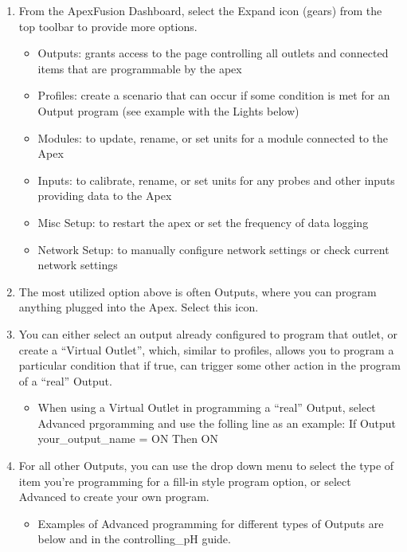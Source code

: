 \documentclass[]{book}
\providecommand{\tightlist}{%
  \setlength{\itemsep}{0pt}\setlength{\parskip}{0pt}}
\begin{document}
\begin{enumerate}
\def\labelenumi{\arabic{enumi}.}
\tightlist
\item
  From the ApexFusion Dashboard, select the Expand icon (gears) from the
  top toolbar to provide more options.

  \begin{itemize}
  \tightlist
  \item
    Outputs: grants access to the page controlling all outlets and
    connected items that are programmable by the apex
  \item
    Profiles: create a scenario that can occur if some condition is met
    for an Output program (see example with the Lights below)
  \item
    Modules: to update, rename, or set units for a module connected to
    the Apex
  \item
    Inputs: to calibrate, rename, or set units for any probes and other
    inputs providing data to the Apex
  \item
    Misc Setup: to restart the apex or set the frequency of data logging
  \item
    Network Setup: to manually configure network settings or check
    current network settings
  \end{itemize}
\item
  The most utilized option above is often Outputs, where you can program
  anything plugged into the Apex. Select this icon.
\item
  You can either select an output already configured to program that
  outlet, or create a ``Virtual Outlet'', which, similar to profiles,
  allows you to program a particular condition that if true, can trigger
  some other action in the program of a ``real'' Output.

  \begin{itemize}
  \tightlist
  \item
    When using a Virtual Outlet in programming a ``real'' Output, select
    Advanced prgoramming and use the folling line as an example: If
    Output your\_output\_name = ON Then ON
  \end{itemize}
\item
  For all other Outputs, you can use the drop down menu to select the
  type of item you're programming for a fill-in style program option, or
  select Advanced to create your own program.

  \begin{itemize}
  \tightlist
  \item
    Examples of Advanced programming for different types of Outputs are
    below and in the controlling\_pH guide.
  \end{itemize}
\end{enumerate}
\end{document}
